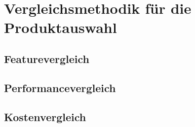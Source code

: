 \section{Vergleichsmethodik für die Produktauswahl}

\subsection{Featurevergleich}

\subsection{Performancevergleich}

\subsection{Kostenvergleich}